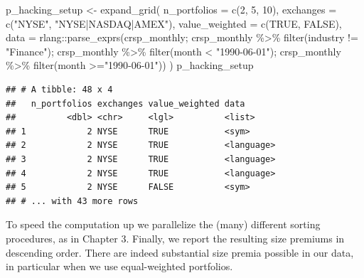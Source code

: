 \documentclass[
]{krantz}
\newenvironment{Shaded}{\begin{snugshade}}{\end{snugshade}}
\newcommand{\AttributeTok}[1]{\textcolor[rgb]{0.61,0.61,0.61}{#1}}
\newcommand{\ConstantTok}[1]{\textcolor[rgb]{0,0,0}{#1}}
\newcommand{\DecValTok}[1]{\textcolor[rgb]{0.06,0.06,0.06}{#1}}
\newcommand{\FunctionTok}[1]{\textcolor[rgb]{0,0,0}{#1}}
\newcommand{\NormalTok}[1]{#1}
\newcommand{\OtherTok}[1]{\textcolor[rgb]{0.37,0.37,0.37}{#1}}
\newcommand{\SpecialCharTok}[1]{\textcolor[rgb]{0,0,0}{#1}}
\newcommand{\StringTok}[1]{\textcolor[rgb]{0.5,0.5,0.5}{#1}}
\begin{document}
\begin{Shaded}
\begin{Highlighting}[]
\NormalTok{p\_hacking\_setup }\OtherTok{\textless{}{-}} \FunctionTok{expand\_grid}\NormalTok{(}
  \AttributeTok{n\_portfolios =} \FunctionTok{c}\NormalTok{(}\DecValTok{2}\NormalTok{, }\DecValTok{5}\NormalTok{, }\DecValTok{10}\NormalTok{),}
  \AttributeTok{exchanges =} \FunctionTok{c}\NormalTok{(}\StringTok{"NYSE"}\NormalTok{, }\StringTok{"NYSE|NASDAQ|AMEX"}\NormalTok{),}
  \AttributeTok{value\_weighted =} \FunctionTok{c}\NormalTok{(}\ConstantTok{TRUE}\NormalTok{, }\ConstantTok{FALSE}\NormalTok{),}
  \AttributeTok{data =}\NormalTok{ rlang}\SpecialCharTok{::}\FunctionTok{parse\_exprs}\NormalTok{(}\StringTok{\textquotesingle{}crsp\_monthly; crsp\_monthly \%\textgreater{}\% filter(industry != "Finance");}
\StringTok{                             crsp\_monthly \%\textgreater{}\% filter(month \textless{} "1990{-}06{-}01");}
\StringTok{                             crsp\_monthly \%\textgreater{}\% filter(month \textgreater{}="1990{-}06{-}01")\textquotesingle{}}\NormalTok{)}
\NormalTok{)}
\NormalTok{p\_hacking\_setup}
\end{Highlighting}
\end{Shaded}

\begin{verbatim}
## # A tibble: 48 x 4
##   n_portfolios exchanges value_weighted data      
##          <dbl> <chr>     <lgl>          <list>    
## 1            2 NYSE      TRUE           <sym>     
## 2            2 NYSE      TRUE           <language>
## 3            2 NYSE      TRUE           <language>
## 4            2 NYSE      TRUE           <language>
## 5            2 NYSE      FALSE          <sym>     
## # ... with 43 more rows
\end{verbatim}

To speed the computation up we parallelize the (many) different sorting procedures, as in Chapter 3. Finally, we report the resulting size premiums in descending order. There are indeed substantial size premia possible in our data, in particular when we use equal-weighted portfolios.
\end{document}
